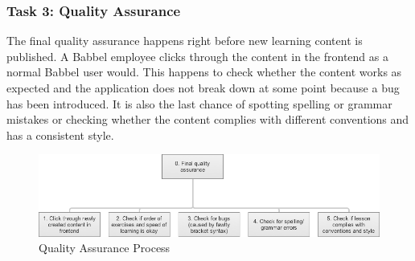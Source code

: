 



\subsubsection{Task 3: Quality Assurance} \label{sec:task-qa}
The final quality assurance happens right before new learning content is published. A Babbel employee clicks through the content in the frontend as a normal Babbel user would. This happens to check whether the content works as expected and the application does not break down at some point because a bug has been introduced. It is also the last chance of spotting spelling or grammar mistakes or checking whether the content complies with different conventions and has a consistent style.

\begin{figure}[h]
 \centering
 \includegraphics[width=\textwidth]{images/task-analysis/quality_assurance}
 \caption{Quality Assurance Process}
 \label{fig:qa-process}
\end{figure}

